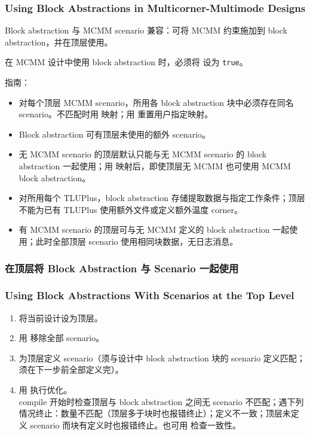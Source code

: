 \subsubsection*{Using Block Abstractions in Multicorner-Multimode Designs}

Block abstraction 与 MCMM scenario 兼容：可将 MCMM 约束施加到 block abstraction，并在顶层使用。

\begin{noteBox}
在 MCMM 设计中使用 block abstraction 时，必须将  设为 \texttt{true}。
\end{noteBox}

指南：
\begin{itemize}
  \item 对每个顶层 MCMM scenario，所用各 block abstraction 块中必须存在同名 scenario。不匹配时用  映射；用  重置用户指定映射。
  \item Block abstraction 可有顶层未使用的额外 scenario。
  \item 无 MCMM scenario 的顶层默认只能与无 MCMM scenario 的 block abstraction 一起使用；用  映射后，即使顶层无 MCMM 也可使用 MCMM block abstraction。
  \item 对所用每个 TLUPlus，block abstraction 存储提取数据与指定工作条件；顶层不能为已有 TLUPlus 使用额外文件或定义额外温度 corner。
  \item 有 MCMM scenario 的顶层可与无 MCMM 定义的 block abstraction 一起使用；此时全部顶层 scenario 使用相同块数据，无日志消息。
\end{itemize}

\subsubsection{在顶层将 Block Abstraction 与 Scenario 一起使用}
\subsubsection*{Using Block Abstractions With Scenarios at the Top Level}

\begin{enumerate}
  \item 将当前设计设为顶层。
  \item 用  移除全部 scenario。
  \item 为顶层定义 scenario（须与设计中 block abstraction 块的 scenario 定义匹配；须在下一步前全部定义完）。
  \item 用  执行优化。\\
        compile 开始时检查顶层与 block abstraction 之间无 scenario 不匹配；遇下列情况终止：数量不匹配（顶层多于块时也报错终止）；定义不一致；顶层未定义 scenario 而块有定义时也报错终止。也可用  检查一致性。
\end{enumerate}

